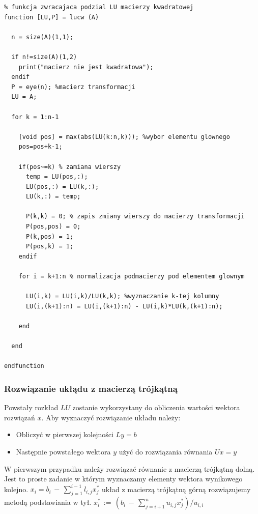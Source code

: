 \documentclass[a4paper, 11pt]{article}
\begin{document}
\begin{lstlisting}
% funkcja zwracajaca podzial LU macierzy kwadratowej
function [LU,P] = lucw (A)

  n = size(A)(1,1);
  
  if n!=size(A)(1,2) 
    print("macierz nie jest kwadratowa");
  endif
  P = eye(n); %macierz transformacji
  LU = A; 
  
  for k = 1:n-1
      
    [void pos] = max(abs(LU(k:n,k))); %wybor elementu glownego
    pos=pos+k-1;
  
    if(pos~=k) % zamiana wierszy
      temp = LU(pos,:);
      LU(pos,:) = LU(k,:);
      LU(k,:) = temp;
        
      P(k,k) = 0; % zapis zmiany wierszy do macierzy transformacji
      P(pos,pos) = 0;
      P(k,pos) = 1;
      P(pos,k) = 1;
    endif
             
    for i = k+1:n % normalizacja podmacierzy pod elementem glownym
          
      LU(i,k) = LU(i,k)/LU(k,k); %wyznaczanie k-tej kolumny
      LU(i,(k+1):n) = LU(i,(k+1):n) - LU(i,k)*LU(k,(k+1):n);
      
    end
    
  end
  
endfunction

\end{lstlisting}

\subsubsection{Rozwiązanie ukłądu z macierzą trójkątną}

Powstały rozkład $LU$ zostanie wykorzystany do obliczenia wartości wektora rozwiązań $x$. 
Aby wyznaczyć rozwiązanie układu należy:
\begin{itemize}
\item Obliczyć w pierwszej kolejności $Ly = b$ 
\item Następnie powstałego wektora $y$ użyć do rozwiązania równania $Ux = y$
\end{itemize}
W pierwszym przypadku należy rozwiązać równanie z macierzą trójkątną dolną. Jest to proste zadanie w którym wyznaczamy elementy wektora wynikowego kolejno. $x_i = b_i\,-\,\sum_{j=1}^{i-1} l_{i,j} x_j^*$
układ z macierzą trójkątną górną rozwiązujemy metodą podstawiania w tył. $x_i^*\,:=\,\left( b_i\,-\, \sum_{j=i+1}^n u_{i,j}x_j^*\right)/u_{i,i}$\\
\end{document}
